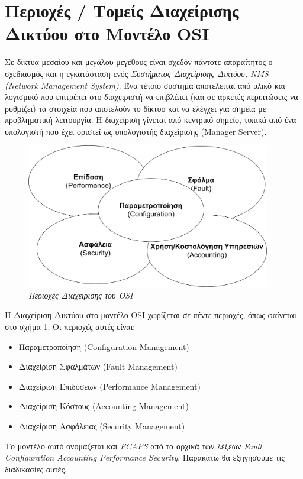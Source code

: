 %
%
\setcounter{section}{1}
\section{Περιοχές / Τομείς Διαχείρισης Δικτύου στο Μοντέλο OSI}

Σε δίκτυα μεσαίου και μεγάλου μεγέθους είναι σχεδόν πάντοτε απαραίτητος ο σχεδιασμός και η εγκατάσταση ενός \emph{Συστήματος Διαχείρισης Δικτύου, NMS (Network Management System)}. Ένα τέτοιο σύστημα αποτελείται από υλικό και λογισμικό που επιτρέπει στο διαχειριστή να επιβλέπει (και σε αρκετές περιπτώσεις να ρυθμίζει) τα στοιχεία που αποτελούν το δίκτυο και να ελέγχει για σημεία με προβληματική λειτουργία. Η διαχείριση γίνεται από κεντρικό σημείο, τυπικά από ένα υπολογιστή που έχει οριστεί ως υπολογιστής διαχείρισης (Manager Server).

\begin{figure}[!ht]
 \centering
 \includegraphics[width=0.95\textwidth]{images/chapter7/7-1}
 \caption {\textsl{Περιοχές Διαχείρισης του OSI}}
 \label{7-1}
\end{figure}

Η Διαχείριση Δικτύου στο μοντέλο OSI χωρίζεται σε πέντε περιοχές, όπως φαίνεται στο σχήμα \ref{7-1}.  Οι περιοχές αυτές είναι:

\begin{itemize}
\item Παραμετροποίηση (Configuration Management)
\item Διαχείριση Σφαλμάτων (Fault Management)
\item Διαχείριση Επιδόσεων (Performance Management)
\item Διαχείριση Κόστους (Accounting Management)
\item Διαχείριση Ασφάλειας (Security Management)
\end{itemize}

Το μοντέλο αυτό ονομάζεται και \emph{FCAPS} από τα αρχικά των λέξεων \emph{Fault Configuration Accounting Performance Security}. Παρακάτω θα εξηγήσουμε τις διαδικασίες αυτές.